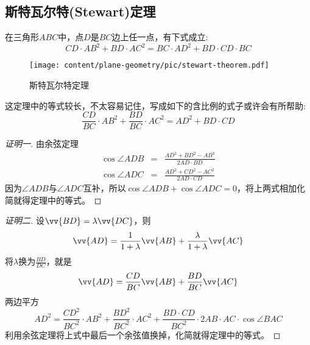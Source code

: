 \subsection{斯特瓦尔特(Stewart)定理}
\label{sec:stewart-theorem}

\begin{theorem}[斯特瓦尔特定理]
  在三角形$ABC$中，点$D$是$BC$边上任一点，有下式成立:
  \begin{equation}
    \label{eq:stewart-theorem}
    CD \cdot AB^2 + BD \cdot AC^2 = BC \cdot AD^2 + BD \cdot CD \cdot BC
  \end{equation}
\end{theorem}

\begin{figure}[htbp]
\centering
\texttt{[image: content/plane-geometry/pic/stewart-theorem.pdf]}
\caption{斯特瓦尔特定理}
\label{fig:stewart-theorem}
\end{figure}

这定理中的等式较长，不太容易记住，写成如下的含比例的式子或许会有所帮助:
\begin{equation}
  \label{eq:stewart-theorem-rate}
  \frac{CD}{BC}\cdot AB^2 + \frac{BD}{BC} \cdot AC^2 = AD^2 + BD \cdot CD
\end{equation}

\begin{proof}[证明一]
  由余弦定理
  \begin{eqnarray*}
    \cos{\angle ADB} & = & \frac{AD^2+BD^2-AB^2}{2 AD \cdot BD} \\
    \cos{\angle ADC} & = & \frac{AD^2+CD^2-AC^2}{2 AD \cdot CD} 
  \end{eqnarray*}
  因为$\angle ADB$与$\angle ADC$互补，所以$\cos{\angle ADB} + \cos{\angle ADC} = 0$，将上两式相加化简就得定理中的等式。
\end{proof}

\begin{proof}[证明二]
  设$\vv{BD}=\lambda \vv{DC}$，则
  \begin{equation*}
    \vv{AD}=\frac{1}{1+\lambda}\vv{AB}+\frac{\lambda}{1+\lambda}\vv{AC}
  \end{equation*}
  将$\lambda$换为$\frac{BD}{DC}$，就是
  \begin{equation*}
    \vv{AD}=\frac{CD}{BC}\vv{AB}+\frac{BD}{BC}\vv{AC}
  \end{equation*}
  两边平方
  \begin{equation*}
    AD^2=\frac{CD^2}{BC^2} \cdot AB^2 + \frac{BD^2}{BC^2} \cdot AC^2 + \frac{ BD \cdot CD}{BC^2} \cdot 2 AB \cdot AC \cdot \cos{\angle BAC}
  \end{equation*}
  利用余弦定理将上式中最后一个余弦值换掉，化简就得定理中的等式。
\end{proof}

